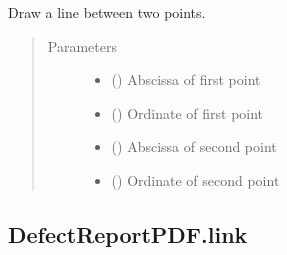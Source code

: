 \documentclass[letterpaper,10pt,english]{sphinxmanual}
\begin{document}
\begin{fulllineitems}
\begin{fulllineitems}
\label{\detokenize{generated/quality_assessment.quality_pdf_report.DefectReportPDF.line:quality_assessment.quality_pdf_report.DefectReportPDF.line}}
\sphinxAtStartPar
Draw a line between two points.
\begin{quote}\begin{description}
\item[{Parameters}] \leavevmode\begin{itemize}
\item {} 
\sphinxAtStartPar
{} () \textendash{} Abscissa of first point

\item {} 
\sphinxAtStartPar
{} () \textendash{} Ordinate of first point

\item {} 
\sphinxAtStartPar
{} () \textendash{} Abscissa of second point

\item {} 
\sphinxAtStartPar
{} () \textendash{} Ordinate of second point

\end{itemize}

\end{description}\end{quote}

\end{fulllineitems}



\subsection{DefectReportPDF.link}
\label{\detokenize{generated/quality_assessment.quality_pdf_report.DefectReportPDF.link:defectreportpdf-link}}\label{\detokenize{generated/quality_assessment.quality_pdf_report.DefectReportPDF.link::doc}}


\end{fulllineitems}
\end{document}
